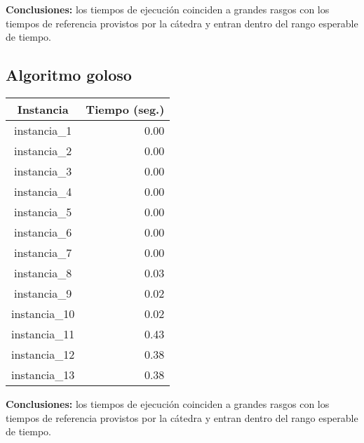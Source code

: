 \documentclass[10pt, a4paper]{article}
\begin{document}
\textbf{Conclusiones:} los tiempos de ejecución coinciden a grandes rasgos con los tiempos de referencia provistos por la cátedra y entran dentro del rango esperable de tiempo.

\subsection{Algoritmo goloso}

\begin{center}
\begin{tabular}{ c r } 
Instancia & Tiempo (seg.) \\
\hline
instancia\_1 & 0.00 \\
instancia\_2 & 0.00 \\
instancia\_3 & 0.00 \\
instancia\_4 & 0.00 \\
instancia\_5 & 0.00 \\
instancia\_6 & 0.00 \\
instancia\_7 & 0.00 \\
instancia\_8 & 0.03 \\
instancia\_9 & 0.02 \\
instancia\_10 & 0.02 \\
instancia\_11 & 0.43 \\
instancia\_12 & 0.38 \\
instancia\_13 & 0.38 \\
\end{tabular}
\end{center}

\textbf{Conclusiones:} los tiempos de ejecución coinciden a grandes rasgos con los tiempos de referencia provistos por la cátedra y entran dentro del rango esperable de tiempo.
\end{document}
